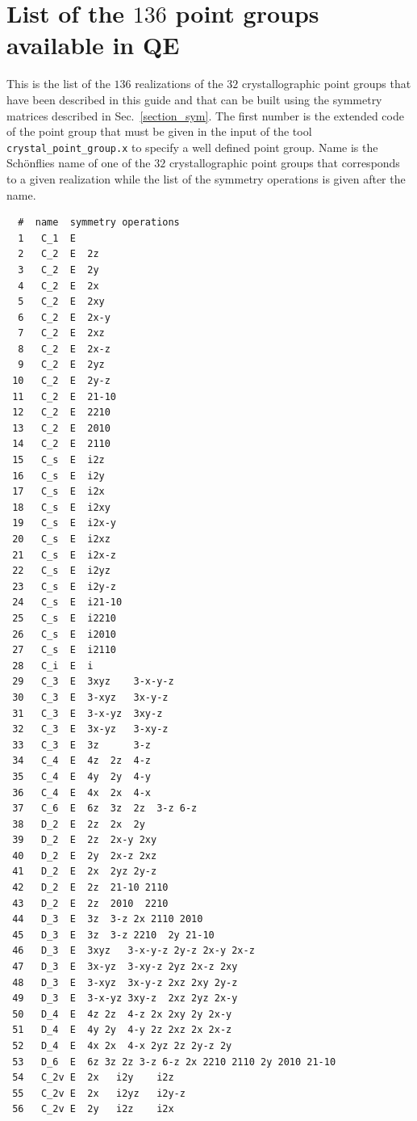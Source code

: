 \documentclass[12pt,a4paper]{article}
\begin{document}
\section{\color{coral}List of the $136$ point groups available in QE}

This is the list of the $136$ realizations of the $32$ crystallographic 
point groups that have been described in this guide and that can be built 
using the symmetry matrices described in 
Sec.~\ref{section_sym}. The first number is
the extended code of the point group that must be given in the input 
of the tool \texttt{crystal\_point\_group.x} to specify a well
defined point group. Name is the Sch\"onflies name of one of the $32$
crystallographic point groups that corresponds to a given realization while
the list of the symmetry operations is given after the name.
\begin{verbatim}
  #  name  symmetry operations
  1   C_1  E           
  2   C_2  E  2z       
  3   C_2  E  2y       
  4   C_2  E  2x       
  5   C_2  E  2xy      
  6   C_2  E  2x-y     
  7   C_2  E  2xz      
  8   C_2  E  2x-z     
  9   C_2  E  2yz      
 10   C_2  E  2y-z     
 11   C_2  E  21-10    
 12   C_2  E  2210     
 13   C_2  E  2010     
 14   C_2  E  2110     
 15   C_s  E  i2z      
 16   C_s  E  i2y      
 17   C_s  E  i2x      
 18   C_s  E  i2xy    
 19   C_s  E  i2x-y    
 20   C_s  E  i2xz     
 21   C_s  E  i2x-z    
 22   C_s  E  i2yz     
 23   C_s  E  i2y-z    
 24   C_s  E  i21-10   
 25   C_s  E  i2210    
 26   C_s  E  i2010    
 27   C_s  E  i2110    
 28   C_i  E  i        
 29   C_3  E  3xyz    3-x-y-z 
 30   C_3  E  3-xyz   3x-y-z  
 31   C_3  E  3-x-yz  3xy-z   
 32   C_3  E  3x-yz   3-xy-z  
 33   C_3  E  3z      3-z     
 34   C_4  E  4z  2z  4-z     
 35   C_4  E  4y  2y  4-y     
 36   C_4  E  4x  2x  4-x     
 37   C_6  E  6z  3z  2z  3-z 6-z 
 38   D_2  E  2z  2x  2y      
 39   D_2  E  2z  2x-y 2xy    
 40   D_2  E  2y  2x-z 2xz    
 41   D_2  E  2x  2yz 2y-z    
 42   D_2  E  2z  21-10 2110 
 43   D_2  E  2z  2010  2210 
 44   D_3  E  3z  3-z 2x 2110 2010   
 45   D_3  E  3z  3-z 2210  2y 21-10  
 46   D_3  E  3xyz   3-x-y-z 2y-z 2x-y 2x-z  
 47   D_3  E  3x-yz  3-xy-z 2yz 2x-z 2xy 
 48   D_3  E  3-xyz  3x-y-z 2xz 2xy 2y-z   
 49   D_3  E  3-x-yz 3xy-z  2xz 2yz 2x-y 
 50   D_4  E  4z 2z  4-z 2x 2xy 2y 2x-y 
 51   D_4  E  4y 2y  4-y 2z 2xz 2x 2x-z 
 52   D_4  E  4x 2x  4-x 2yz 2z 2y-z 2y 
 53   D_6  E  6z 3z 2z 3-z 6-z 2x 2210 2110 2y 2010 21-10 
 54   C_2v E  2x   i2y    i2z     
 55   C_2v E  2x   i2yz   i2y-z   
 56   C_2v E  2y   i2z    i2x     

\end{verbatim}
\end{document}

